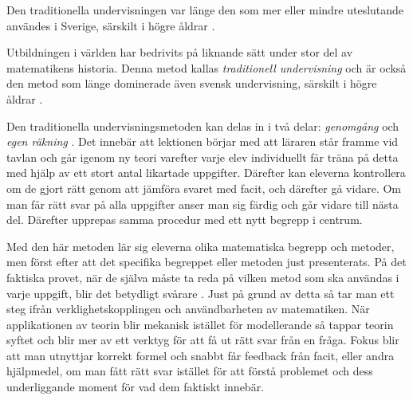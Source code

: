 
\textcolor{lila}{Den traditionella undervisningen var länge den som mer eller mindre uteslutande användes i Sverige, särskilt i högre åldrar \cite{Namnaren}.}

Utbildningen i världen har bedrivits på liknande sätt under stor del av matematikens historia. Denna metod kallas \textsl{traditionell undervisning} och är också den metod som länge dominerade även svensk undervisning, särskilt i högre åldrar \cite{Namnaren}.

\textcolor{lila}{Den traditionella undervisningsmetoden kan delas in i två delar: \textsl{genomgång} och \textsl{egen räkning} \cite{traditionellMatte}. Det innebär att lektionen börjar med att läraren står framme vid tavlan och går igenom ny teori varefter varje elev individuellt får träna på detta med hjälp av ett stort antal likartade uppgifter. Därefter kan eleverna kontrollera om de gjort rätt genom att jämföra svaret med facit, och därefter gå vidare. Om man får rätt svar på alla uppgifter anser man sig färdig och går vidare till nästa del. Därefter upprepas samma procedur med ett nytt begrepp i centrum.} 
    
\textcolor{lila}{Med den här metoden lär sig eleverna olika matematiska begrepp och metoder, men först efter att det specifika begreppet eller metoden just presenterats. På det faktiska provet, när de själva måste ta reda på vilken metod som ska användas i varje uppgift, blir det betydligt svårare \cite{TheElephant}. }
\textcolor{WildStrawberry}{
    Just på grund av detta så tar man ett steg ifrån verklighetskopplingen och användbarheten av matematiken. När applikationen av teorin blir mekanisk istället för modellerande så tappar teorin syftet och blir mer av ett verktyg för att få ut rätt svar från en fråga. Fokus blir att man utnyttjar korrekt formel och snabbt får feedback från facit, eller andra hjälpmedel, om man fått rätt svar istället för att förstå problemet och dess underliggande moment för vad dem faktiskt innebär. }


